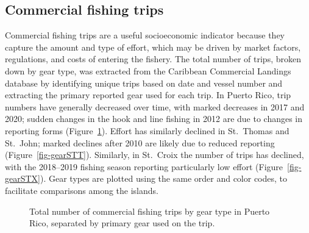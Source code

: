 \documentclass[
  letterpaper,
  oneside,
  open=any]{scrbook}
\begin{document}
\subsection{Commercial fishing trips}\label{commercial-fishing-trips}

Commercial fishing trips are a useful socioeconomic indicator because
they capture the amount and type of effort, which may be driven by
market factors, regulations, and costs of entering the fishery. The
total number of trips, broken down by gear type, was extracted from the
Caribbean Commercial Landings database by identifying unique trips based
on date and vessel number and extracting the primary reported gear used
for each trip. In Puerto Rico, trip numbers have generally decreased
over time, with marked decreases in 2017 and 2020; sudden changes in the
hook and line fishing in 2012 are due to changes in reporting forms
(Figure~\ref{fig-gearPR}). Effort has similarly declined in St.~Thomas
and St.~John; marked declines after 2010 are likely due to reduced
reporting (Figure~\ref{fig-gearSTT}). Similarly, in St.~Croix the number
of trips has declined, with the 2018--2019 fishing season reporting
particularly low effort (Figure~\ref{fig-gearSTX}). Gear types are
plotted using the same order and color codes, to facilitate comparisons
among the islands.

\begin{figure}


\caption{\label{fig-gearPR}Total number of commercial fishing trips by
gear type in Puerto Rico, separated by primary gear used on the trip.}

\end{figure}%
\end{document}

